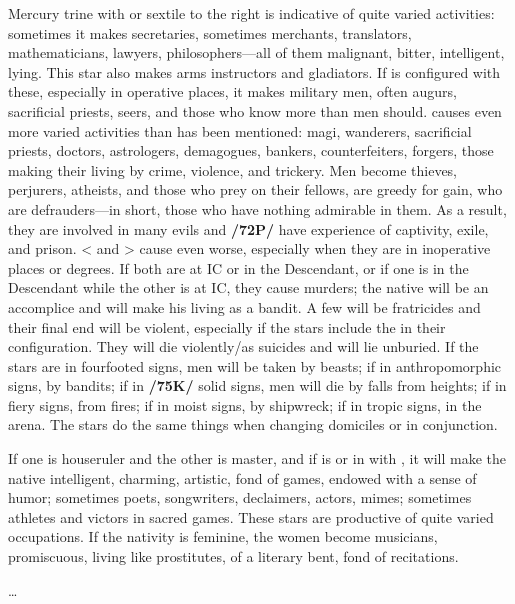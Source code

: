 Mercury \marginnote{\Mercury \Trine \Mars} trine with \Mars\xspace or sextile to the right is indicative of quite varied activities: sometimes it makes secretaries, sometimes merchants, translators, mathematicians, lawyers, philosophers—all of them malignant, bitter, intelligent, lying. This star also makes arms instructors and gladiators. If \Jupiter\xspace is configured with these, especially in operative places, it makes military men, often augurs, sacrificial priests,
seers, and those who know more than men should. \Mercury\xspace \Square\xspace causes even more varied activities than has been mentioned: magi, wanderers, sacrificial priests, doctors, astrologers, demagogues, bankers, counterfeiters, forgers, those making their living by crime, violence, and trickery. Men become thieves, perjurers, atheists, and those who prey on their fellows, are greedy for gain, who are defrauders—in short, those who have nothing admirable in them. As a result, they are involved in many evils and \textbf{/72P/} have experience of captivity, exile, and prison. <\Mars\xspace and \Mercury> cause even worse, especially when they are in inoperative places or degrees. If both are at IC or in the Descendant, or if one is in the Descendant while the other is at  IC, they cause murders; the native will be an accomplice and will make his living as a
bandit. A few will be fratricides and their final end will be violent, especially if the stars include the \Moon\xspace in their configuration. They will die violently/as suicides and will lie unburied. If the stars are in fourfooted signs, men will be taken by beasts; if in anthropomorphic signs, by bandits; if in \textbf{/75K/} solid signs, men will die by falls from heights; if in fiery signs, from fires; if in moist signs, by shipwreck; if in tropic
signs, in the arena. \mndl The stars do the same things when changing domiciles or in conjunction. 

If one is houseruler and the other is master, and if \Mercury\xspace is \Sextile\xspace or in \Conjunction\xspace with \Venus, it will make the native intelligent, charming, artistic, fond of games, endowed with a sense of humor; sometimes poets, songwriters, declaimers, actors, mimes; sometimes athletes and victors in sacred games. These stars are productive of quite varied occupations. If the nativity is feminine, the women become musicians, promiscuous, living like prostitutes, of a literary bent, fond of recitations.

\ldots

